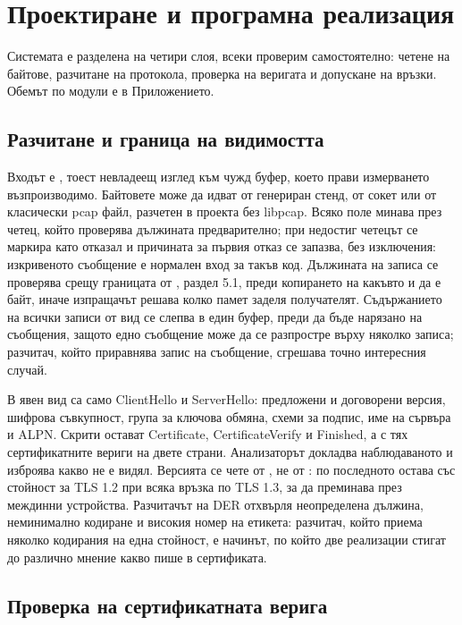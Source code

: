 \section{Проектиране и програмна реализация}
\label{sec:design}

Системата е разделена на четири слоя, всеки проверим самостоятелно: четене на байтове, разчитане
на протокола, проверка на веригата и допускане на връзки. Обемът по модули е в Приложението.

\subsection{Разчитане и граница на видимостта}
\label{subsec:parser}

Входът е , тоест невладеещ изглед към чужд буфер, което прави
измерването възпроизводимо. Байтовете може да идват от генериран стенд, от сокет или от
класически pcap файл, разчетен в проекта без libpcap. Всяко поле минава през четец, който проверява дължината
предварително; при недостиг четецът се маркира като отказал и причината за първия отказ се
запазва, без изключения: изкривеното съобщение е нормален вход за такъв код. Дължината на записа
се проверява срещу границата от
\cite{rfc8446}, раздел 5.1, преди копирането на какъвто и да е байт, иначе изпращачът решава колко
памет заделя получателят. Съдържанието на всички записи от вид  се слепва в един
буфер, преди да бъде нарязано на съобщения, защото едно съобщение може да се разпростре върху
няколко записа; разчитач, който приравнява запис на съобщение, сгрешава точно интересния случай.

В явен вид са само ClientHello и ServerHello: предложени и договорени версия, шифрова съвкупност,
група за ключова обмяна, схеми за подпис, име на сървъра и ALPN. Скрити остават Certificate,
CertificateVerify и Finished, а с тях сертификатните вериги на двете страни. Анализаторът
докладва наблюдаваното и изброява какво не е видял. Версията се чете от
, не от : по \cite{rfc8446} последното остава със
стойност за TLS 1.2 при всяка връзка по TLS 1.3, за да преминава през междинни устройства.
Разчитачът на DER отхвърля неопределена дължина, неминимално кодиране и високия номер на етикета:
разчитач, който приема няколко кодирания на една стойност, е начинът, по който две реализации
стигат до различно мнение какво пише в сертификата.

\subsection{Проверка на сертификатната верига}
\label{subsec:validator}

